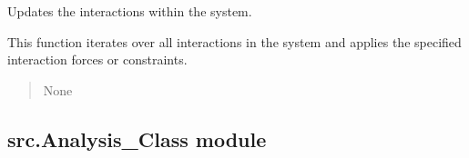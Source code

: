 \documentclass[letterpaper,10pt,english]{sphinxmanual}
\begin{document}
\begin{fulllineitems}
\begin{fulllineitems}
\end{fulllineitems}


\begin{fulllineitems}
\label{\detokenize{src:src.System_Class.System.update}}
\pysigstartsignatures
{}
\pysigstopsignatures
\sphinxAtStartPar
Updates the interactions within the system.

\sphinxAtStartPar
This function iterates over all interactions in the system and applies the
specified interaction forces or constraints.
\begin{quote}\begin{description}
\sphinxAtStartPar
{}

\sphinxAtStartPar
None

\end{description}\end{quote}

\end{fulllineitems}


\end{fulllineitems}



\subsection{src.Analysis\_Class module}
\label{\detokenize{src:module-src.Analysis_Class}}\label{\detokenize{src:src-analysis-class-module}}
\end{document}
